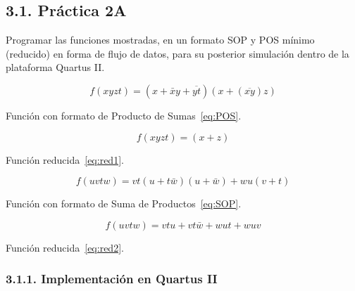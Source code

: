 \documentclass[letterpaper]{article} %
\begin{document}
        \subsection*{3.1. Pr\'actica 2A}
        Programar las funciones mostradas, en un formato SOP y POS m\'inimo (reducido) en
        forma de flujo de datos, para su posterior simulaci\'on dentro de la plataforma Quartus II.

        \begin{equation}
            \label{eq:POS}
            f(xyzt) = (x + \bar{x}y + \overline{yt})(x + (\overline{xy})z)
        \end{equation}

        Funci\'on con formato de Producto de Sumas~\ref{eq:POS}.

        \begin{equation}
            \label{eq:red1}
            f(xyzt) = (x + z)
        \end{equation}

        Funci\'on reducida~\ref{eq:red1}.

        \begin{equation}
            \label{eq:SOP}
            f(uvtw) = vt(u + t\bar{w})(u + \bar{w}) + wu(v +t)
        \end{equation}

        Funci\'on con formato de Suma de Productos~\ref{eq:SOP}.

        \begin{equation}
            \label{eq:red2}
            f(uvtw) = vtu + vt\bar{w} + wut +wuv
        \end{equation}

        Funci\'on reducida~\ref{eq:red2}.

            \subsubsection*{3.1.1. Implementaci\'on en Quartus II}

                \begin{figure}[H]
                    \raggedright
                \end{figure}
\end{document}
